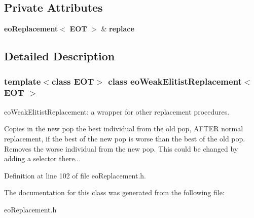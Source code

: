 \subsection*{Private Attributes}
\begin{CompactItemize}
\item 
{\bf eo\-Replacement}$<$ {\bf EOT} $>$ \& {\bf replace}\label{classeo_weak_elitist_replacement_r0}

\end{CompactItemize}


\subsection{Detailed Description}
\subsubsection*{template$<$class EOT$>$ class eo\-Weak\-Elitist\-Replacement$<$ EOT $>$}

eo\-Weak\-Elitist\-Replacement: a wrapper for other replacement procedures. 

Copies in the new pop the best individual from the old pop, AFTER normal replacement, if the best of the new pop is worse than the best of the old pop. Removes the worse individual from the new pop. This could be changed by adding a selector there... 



Definition at line 102 of file eo\-Replacement.h.

The documentation for this class was generated from the following file:\begin{CompactItemize}
\item 
eo\-Replacement.h\end{CompactItemize}
